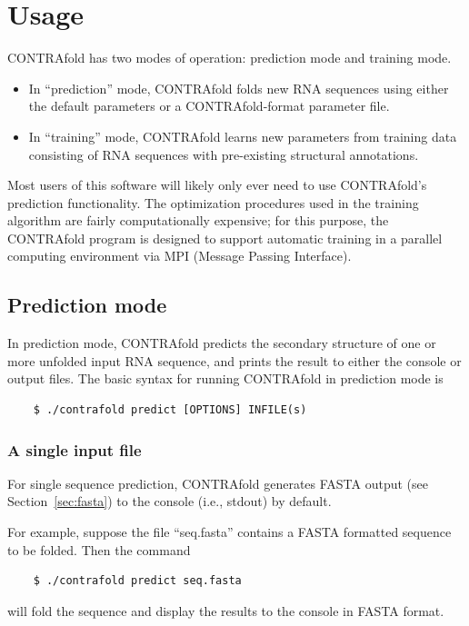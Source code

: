 \documentclass{article}
\begin{document}
  \newpage
  \section{Usage}
  \label{sec:usage}

  CONTRAfold has two modes of operation: prediction mode and training
  mode.
  \begin{itemize}
  \item In ``prediction'' mode, CONTRAfold folds new RNA
    sequences using either the default parameters or a CONTRAfold-format 
    parameter file.
  \item In ``training'' mode, CONTRAfold learns new parameters from 
    training data consisting of RNA sequences with pre-existing structural annotations.
  \end{itemize}
  Most users of this software will likely only ever need to use
  CONTRAfold's prediction functionality.  The optimization procedures
  used in the training algorithm are fairly computationally expensive;
  for this purpose, the CONTRAfold program is designed to support
  automatic training in a parallel computing environment via MPI 
  (Message Passing Interface).

  \subsection{Prediction mode}

  In prediction mode, CONTRAfold predicts the secondary structure of one
  or more unfolded input RNA sequence, and prints the result to either 
  the console or output files.  The basic syntax for running CONTRAfold
  in prediction mode is
  \begin{verbatim}
    $ ./contrafold predict [OPTIONS] INFILE(s)\end{verbatim}

  \subsubsection{A single input file}

  For single sequence prediction, CONTRAfold generates FASTA
  output (see Section~\ref{sec:fasta}) to the console (i.e., stdout) by default.  

  For example, suppose the file ``seq.fasta'' contains a FASTA 
  formatted sequence to be folded.  Then the command
  \begin{verbatim}
    $ ./contrafold predict seq.fasta\end{verbatim}
  will fold the sequence and display the results to the console in
  FASTA format.
  
\end{document}

